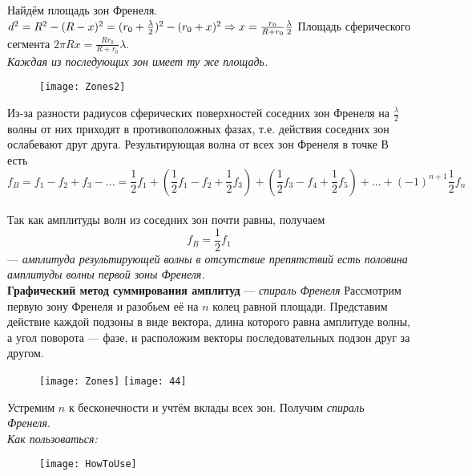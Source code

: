Найдём площадь зон Френеля. $d^2 = R^2 - (R-x)^2 = (r_0 + \frac{\lambda} {2})^2 - (r_0+x)^2 \Rightarrow x = \frac{r_0}{R+r_0} \frac{\lambda}{2}\\$
Площадь сферического сегмента $2\pi R x = \frac{Rr_0}{R+r_0}\lambda$.\\ \textit{Каждая из последующих зон имеет ту же площадь.}
\begin{figure}[H]
	\centering
	\texttt{[image: Zones2]}
\end{figure}

Из-за разности радиусов сферических поверхностей соседних зон Френеля на $\frac{\lambda} {2}$ волны от них приходят в противоположных фазах, т.е. действия соседних зон ослабевают друг друга. Результирующая волна от всех зон Френеля в точке В есть
$$f_B = f_1 - f_2 + f_3 -... = \frac 1{2} f_1 +(\frac 1{2} f_1 - f_2 + \frac 1{2} f_3) + (\frac 1{2} f_3 - f_4 +\frac 1{2} f_5)+...+(-1)^{n+1}\frac 1{2} f_n$$\\
Так как амплитуды волн из соседних зон почти равны, получаем $$f_B = \frac 1{2} f_1$$ --- \textit{амплитуда результирующей волны в отсутствие препятствий есть половина амплитуды волны первой зоны Френеля.}
$$
$$
\textbf{Графический метод суммирования амплитуд} --- \textit{спираль Френеля}
Рассмотрим первую зону Френеля и разобьем её на $n$ колец равной площади. Представим действие каждой подзоны в виде вектора, длина которого равна амплитуде волны, а угол поворота --- фазе, и расположим векторы последовательных подзон друг за другом.
\begin{figure}[H]
	\centering
	\texttt{[image: Zones]}
	\texttt{[image: 44]}
\end{figure}

Устремим $n$ к бесконечности и учтём вклады всех зон. Получим \textit{спираль Френеля}.
$$
$$
\textit{Как пользоваться:}

\begin{figure}[H]
	\centering
	\texttt{[image: HowToUse]}
\end{figure}
